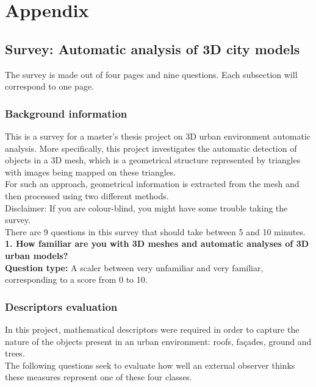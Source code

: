 \documentclass{kththesis}
\begin{document}
\printbibliography[heading=bibintoc] %

\appendix
\chapter{Appendix}
\section{Survey: Automatic analysis of 3D city models}
\label{sec:survey}
The survey is made out of four pages and nine questions. Each subsection will correspond to one page. 
\subsection{Background information}
This is a survey for a master's thesis project on 3D urban environment automatic analysis. More specifically, this project investigates the automatic detection of objects in a 3D mesh, which is a geometrical structure represented by triangles with images being mapped on these triangles. \\
For such an approach, geometrical information is extracted from the mesh and then processed using two different methods.  \\

Disclaimer: If you are colour-blind, you might have some trouble taking the survey. \\

There are 9 questions in this survey that should take between 5 and 10 minutes. \\

\textbf{1. How familiar are you with 3D meshes and automatic analyses of 3D urban models?} \\

\textbf{Question type:} A scaler between very unfamiliar and very familiar, corresponding to a score from 0 to 10.

\subsection{Descriptors evaluation}
In this project, mathematical descriptors were required in order to capture the nature of the objects present in an urban environment: roofs, façades, ground and trees. \\
The following questions seek to evaluate how well an external observer thinks these measures represent one of these four classes. \\
\end{document}
